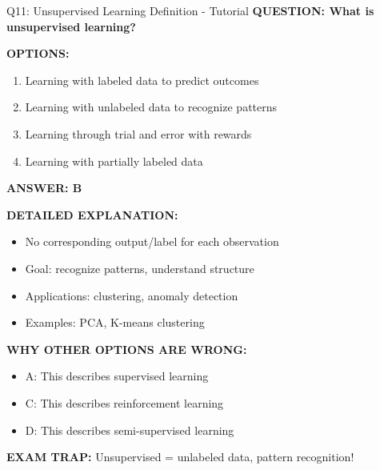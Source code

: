 \documentclass[8pt]{beamer}
\begin{document}
	\begin{frame}{Q11: Unsupervised Learning Definition - Tutorial}
		\fontsize{6.5}{7.5}\selectfont
		\textbf{QUESTION: What is unsupervised learning?}
		
		\vspace{0.1cm}
		\textbf{OPTIONS:}
		\begin{enumerate}
			\item Learning with labeled data to predict outcomes
			\item Learning with unlabeled data to recognize patterns
			\item Learning through trial and error with rewards
			\item Learning with partially labeled data
		\end{enumerate}
		
		\vspace{0.1cm}
		\textcolor{myblue}{\textbf{ANSWER: B}}
		
		\vspace{0.1cm}
		\textbf{DETAILED EXPLANATION:}
		\begin{itemize}
			\item No corresponding output/label for each observation
			\item Goal: recognize patterns, understand structure
			\item Applications: clustering, anomaly detection
			\item Examples: PCA, K-means clustering
		\end{itemize}
		
		\vspace{0.1cm}
		\textcolor{myred}{\textbf{WHY OTHER OPTIONS ARE WRONG:}}
		\begin{itemize}
			\item \textcolor{myred}{A:} This describes supervised learning
			\item \textcolor{myred}{C:} This describes reinforcement learning
			\item \textcolor{myred}{D:} This describes semi-supervised learning
		\end{itemize}
		
		\textcolor{myred}{\textbf{EXAM TRAP:}} Unsupervised = \textcolor{myblue}{unlabeled data, pattern recognition}!
	\end{frame}
	
\end{document}
